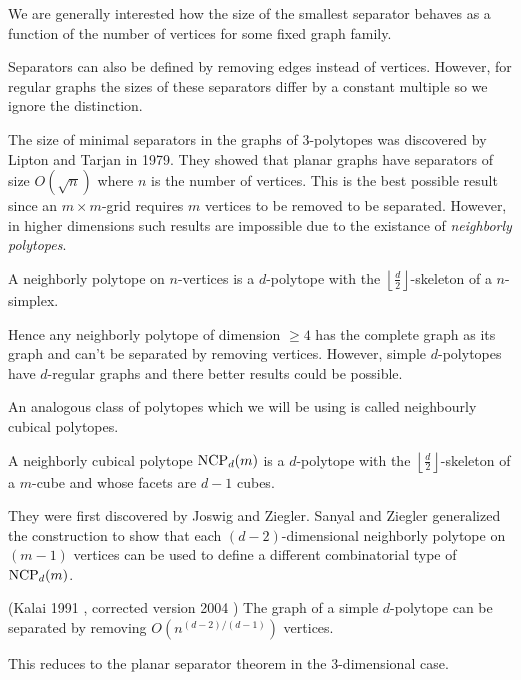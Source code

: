 We are generally interested how the size of the smallest separator behaves as a 
function 
of the number of vertices for some fixed graph family.

Separators can also be defined by removing edges instead of vertices. However, 
for regular graphs the sizes of these separators differ by a constant multiple 
so we ignore the distinction.

The size of minimal separators in the graphs of 3-polytopes was discovered by 
Lipton and Tarjan \cite{LiTa} in 1979. They showed that planar graphs have 
separators of size $O(\sqrt{n})$ where $n$ is the number of vertices. This is 
the best possible result since an $m\times m$-grid requires $m$ vertices to be 
removed to be separated. However, in higher dimensions such results are 
impossible due to the existance of \textit{neighborly polytopes}.

\begin{definition}
 A neighborly polytope on $n$-vertices is a $d$-polytope with the $\left\lfloor 
\frac{d}{2} \right\rfloor$-skeleton of a $n$-simplex.
\end{definition}

Hence any neighborly polytope of dimension $\geq 4$ has the complete graph as 
its graph and can't be separated by removing vertices. However, simple 
$d$-polytopes have $d$-regular graphs and there better results could be 
possible. 

An analogous class of polytopes which we will be using is called neighbourly 
cubical polytopes. 

\begin{definition}
 A neighborly cubical polytope $\textrm{NCP}_d(m)$ is a $d$-polytope with the 
$\left\lfloor \frac{d}{2} 
\right\rfloor$-skeleton of a $m$-cube and whose facets are $d-1$ cubes.
\end{definition}

They were first discovered by Joswig and Ziegler. Sanyal and Ziegler \cite{Z102}
generalized the construction to show that each $(d-2)$-dimensional neighborly 
polytope on $(m-1)$ vertices can be used to define a 
different combinatorial type of $\textrm{NCP}_d(m)$. 

\begin{conjecture}
\label{simpleconjecture}
 (Kalai 1991 \cite{Ka2}, corrected version 2004 \cite{kalai04:_polyt}) The 
graph of a simple $d$-polytope can be separated by removing 
$O(n^{(d-2)/(d-1)})$ vertices. 
\end{conjecture}

This reduces to the planar separator theorem in the 3-dimensional case. 



